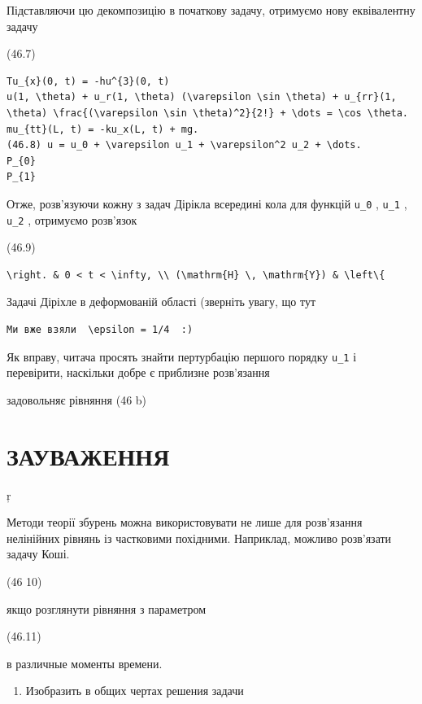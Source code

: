 \documentclass[
  ukrainian,
]{article}
\providecommand{\tightlist}{%
  \setlength{\itemsep}{0pt}\setlength{\parskip}{0pt}}
\begin{document}
Підставляючи цю декомпозицію в початкову задачу, отримуємо нову
еквівалентну задачу

(46.7)

\begin{verbatim}
Tu_{x}(0, t) = -hu^{3}(0, t)
u(1, \theta) + u_r(1, \theta) (\varepsilon \sin \theta) + u_{rr}(1, \theta) \frac{(\varepsilon \sin \theta)^2}{2!} + \dots = \cos \theta.
mu_{tt}(L, t) = -ku_x(L, t) + mg.
(46.8) u = u_0 + \varepsilon u_1 + \varepsilon^2 u_2 + \dots.
P_{0}
P_{1}
\end{verbatim}

Отже, розв'язуючи кожну з задач Дірікла всередині кола для функцій
\texttt{u\_0} , \texttt{u\_1} , \texttt{u\_2} , отримуємо розв'язок

(46.9)

\begin{verbatim}
\right. & 0 < t < \infty, \\ (\mathrm{H} \, \mathrm{Y}) & \left\{
\end{verbatim}

Задачі Діріхле в деформованій області (зверніть увагу, що тут

\begin{verbatim}
Ми вже взяли  \epsilon = 1/4  :)
\end{verbatim}

Як вправу, читача просять знайти пертурбацію першого порядку
\texttt{u\_1} і перевірити, наскільки добре є приблизне розв'язання

задовольняє рівняння (46 b)

\section{ЗАУВАЖЕННЯ}\label{ux437ux430ux443ux432ux430ux436ux435ux43dux43dux44f-4}

ŗ

Методи теорії збурень можна використовувати не лише для розв'язання
нелінійних рівнянь із частковими похідними. Наприклад, можливо
розв'язати задачу Коші.

(46 10)

якщо розглянути рівняння з параметром

(46.11)

в различные моменты времени.

\begin{enumerate}
\def\labelenumi{\arabic{enumi}.}
\setcounter{enumi}{1}
\tightlist
\item
  Изобразить в общих чертах решения задачи
\end{enumerate}
\end{document}
